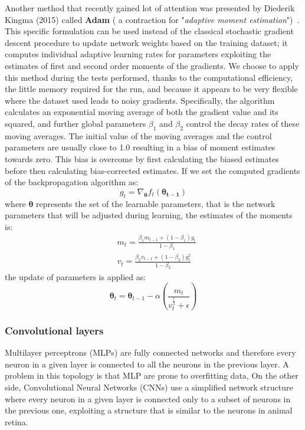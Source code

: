 Another method that recently gained lot of attention was presented by Diederik Kingma (2015) called \textbf{Adam} ( a contraction for "\textit{adaptive moment estimation}")~\cite{kingma2014adam}. This specific formulation can be used instead of the classical stochastic gradient descent procedure to update network weights based on the training dataset; it computes individual adaptive learning rates for parameters exploiting the estimates of first and second order moments of the gradients. 
We choose to apply this method during the tests performed, thanks to the computational efficiency, the little memory required for the run, and because it appears to be very flexible where the dataset used leads to noisy gradients.
Specifically, the algorithm calculates an exponential moving average of both the gradient value and its squared, and further global parameters $\beta_1$ and $\beta_2$ control the decay rates of these moving averages. 
The initial value of the moving averages and the control parameters are usually close to 1.0 resulting in a bias of moment estimates towards zero. This bias is overcome by first calculating the biased estimates before then calculating bias-corrected estimates.
If we set the computed gradients of the backpropagation algorithm as:
\begin{equation}
    g_t = \nabla_{\bm{\theta}} f_t(\bm{\theta_{t-1}})
\end{equation}
where $\bm{\theta}$ represents the set of the learnable parameters, that is the network parameters that will be adjusted during learning, the estimates of the moments is:
\begin{align}
    & m_t = \frac{\beta_1 m_{t-1} + (1 - \beta_1) g_t  }{1-\beta_1} \\
    & v_t = \frac{\beta_2 v_{t-1} + (1 - \beta_2) g_t^2}{1-\beta_2}
\end{align}
the update of parameters is applied as:
\begin{equation}
    \bm{\theta}_t = \bm{\theta}_{t-1} - \alpha \left( \frac{m_t}{v_t^\frac{1}{2} + \epsilon} \right)
\end{equation}

\subsubsection{Convolutional layers}
Multilayer perceptrons (MLPs) are fully connected networks and therefore every neuron in a given layer is connected to all the neurons in the previous layer. A problem in this topology is that MLP are prone to overfitting data, On the other side, Convolutional Neural Networks (CNNs) use a simplified network structure where every neuron in a given layer is connected only to a subset of neurons in the previous one, exploiting a structure that is similar to the neurons in animal retina. 

